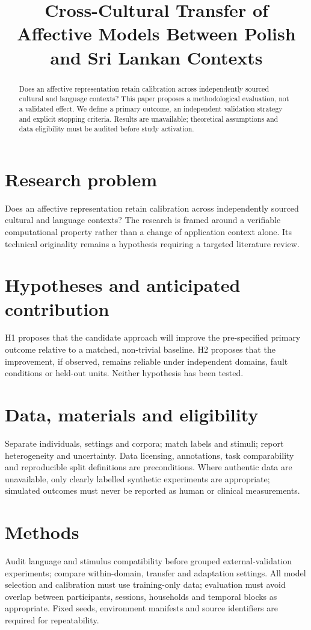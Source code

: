 \documentclass[11pt,a4paper]{article}
\title{Cross-Cultural Transfer of Affective Models Between Polish and Sri Lankan Contexts}
\author{}
\date{}
\begin{document}
\maketitle
\begin{abstract}
Does an affective representation retain calibration across independently sourced cultural and language contexts? This paper proposes a methodological evaluation, not a validated effect. We define a primary outcome, an independent validation strategy and explicit stopping criteria. Results are unavailable; theoretical assumptions and data eligibility must be audited before study activation.
\end{abstract}
\section{Research problem}
Does an affective representation retain calibration across independently sourced cultural and language contexts? The research is framed around a verifiable computational property rather than a change of application context alone. Its technical originality remains a hypothesis requiring a targeted literature review.
\section{Hypotheses and anticipated contribution}
H1 proposes that the candidate approach will improve the pre-specified primary outcome relative to a matched, non-trivial baseline. H2 proposes that the improvement, if observed, remains reliable under independent domains, fault conditions or held-out units. Neither hypothesis has been tested.
\section{Data, materials and eligibility}
Separate individuals, settings and corpora; match labels and stimuli; report heterogeneity and uncertainty. Data licensing, annotations, task comparability and reproducible split definitions are preconditions. Where authentic data are unavailable, only clearly labelled synthetic experiments are appropriate; simulated outcomes must never be reported as human or clinical measurements.
\section{Methods}
Audit language and stimulus compatibility before grouped external-validation experiments; compare within-domain, transfer and adaptation settings. All model selection and calibration must use training-only data; evaluation must avoid overlap between participants, sessions, households and temporal blocks as appropriate. Fixed seeds, environment manifests and source identifiers are required for repeatability.
\end{document}
